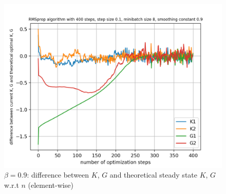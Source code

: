 \documentclass{article}
\begin{document}
\begin{figure}[h!]
\begin{minipage}[t]{.28\paperwidth}
		\includegraphics[width=1.0\textwidth]{Figures/d_beta_0_9_sep.png}
		\caption{$\beta = 0.9$: difference between $K$, $G$ and theoretical steady state $K$, $G$ w.r.t $n$ (element-wise)}
	\end{minipage}
\end{figure}
\end{document}

